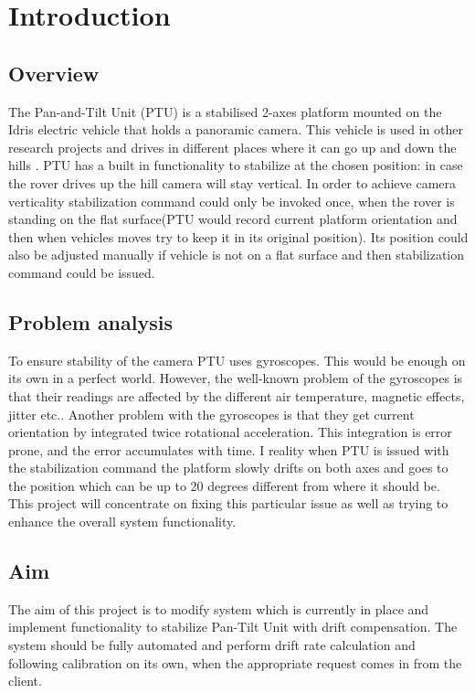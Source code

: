 \chapter{Introduction}

\section{Overview}
The Pan-and-Tilt Unit (PTU) is a stabilised 2-axes platform mounted on the Idris electric vehicle that holds a panoramic camera. This vehicle is used in other research projects and drives in different places where it can go up and down the hills \cite{ProjectIdris}. PTU has a built in functionality to stabilize at the chosen position: in case the rover drives up the hill camera will stay vertical. In order to achieve camera verticality stabilization command could only be invoked once, when the rover is standing on the flat surface(PTU would record current platform orientation and then when vehicles moves try to keep it in its original position). Its position could also be adjusted manually if vehicle is not on a flat surface and then stabilization command could be issued.

\section{Problem analysis}
To ensure stability of the camera PTU uses gyroscopes. This would be enough on its own in a perfect world. However, the well-known problem of the gyroscopes is that their readings are affected by the different air temperature, magnetic effects, jitter etc.\cite{HandbookOfModernSensors}. Another problem with the gyroscopes is that they get current orientation by integrated twice  rotational acceleration. This integration is error prone, and the error accumulates with time. I reality when PTU is issued with the stabilization command the platform slowly drifts on both axes and goes to the position which can be up to 20 degrees different from where it should be. This project will concentrate on fixing this particular issue as well as trying to enhance the overall system functionality. 

\section{Aim}
The aim of this project is to modify system which is currently in place and implement functionality to stabilize Pan-Tilt Unit with drift compensation. The system should be fully automated and perform drift rate calculation and following calibration on its own, when the appropriate request comes in from the client.


